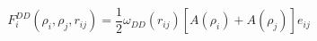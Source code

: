 


$$
 F_{i}^{DD}(\rho_i,\rho_j,r_{ij}) = \frac{1}{2} \omega_{DD}\left(r_{ij}\right) 
                       \left[A\left(\rho_i\right) + A\left(\rho_j\right)\right]e_{ij} 
$$


